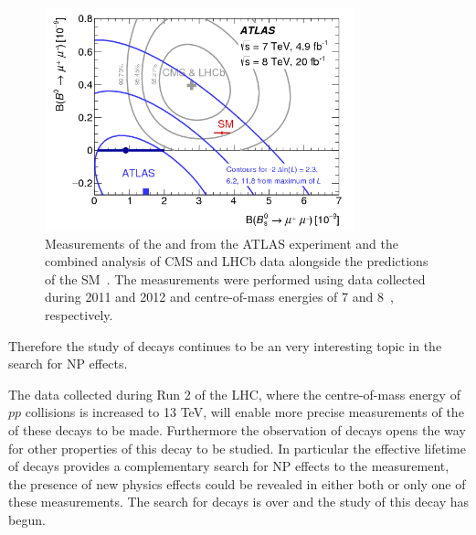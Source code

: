\begin{figure}[tb]
    \centering
        \includegraphics[width=0.8\textwidth]{./Figs/Introduction/contour_plot.png}
        \caption{Measurements of the \bdmumu \BF and \bsmumu \BF from the ATLAS experiment and the combined analysis of CMS and LHCb data alongside the predictions of the SM~\cite{Aaboud:2016ire}. The measurements were performed using data collected during 2011 and 2012 and centre-of-mass energies of 7 and 8~\tev, respectively.}
        \label{fig:contour}
\end{figure}
Therefore the study of \bmumu decays continues to be an very interesting topic in the search for NP effects. 

The data collected during Run 2 of the LHC, where the centre-of-mass energy of $pp$ collisions is increased to 13 TeV, will enable more precise measurements of the \BFs of these decays to be made. 
Furthermore the observation of \bsmumu decays opens the way for other properties of this decay to be studied. In particular the effective lifetime of \bsmumu decays provides a complementary search for NP effects to the \BF measurement, the presence of new physics effects could be revealed in either both or only one of these measurements. The search for \bsmumu decays is over and the study of this decay has begun.



